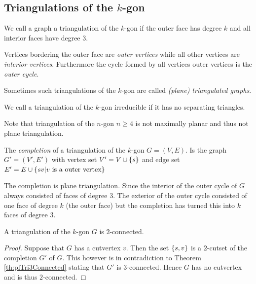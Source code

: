 \subsection{Triangulations of the $k$-gon}

\begin{defi}
We call a graph a triangulation of the $k$-gon if the outer face has degree $k$ and all interior faces have degree $3$.
\end{defi}
Vertices bordering the outer face are \emph{outer vertices} while all other vertices are \emph{interior vertices}. Furthermore the cycle formed by all vertices outer vertices is the \emph{outer cycle}.

Sometimes such triangulations of the $k$-gon are called \emph{(plane) triangulated graphs}.


\begin{defi}
We call a triangulation of the $k$-gon irreducible if it has no separating triangles.
\end{defi}


Note that triangulation of the $n$-gon $n\geq 4$ is not maximally planar and thus not plane triangulation.

The \emph{completion} of a triangulation of the $k$-gon $G = (V, E)$. Is the graph $G'= (V', E')$ with vertex set $V' = V \cup \left\lbrace {s} \right\rbrace$ and edge set $E' = E \cup \left\lbrace { sv | v \text{ is a outer vertex}} \right\rbrace$ 

The completion is plane triangulation.  %
Since the interior of the outer cycle of $G$ always consisted of faces of degree 3. The exterior of the outer cycle consisted of one face of degree $k$ (the outer face) but the completion has turned this into $k$ faces of degree $3$.  

\begin{thrm}
A triangulation of the $k$-gon $G$ is $2$-connected.
\end{thrm}
\begin{proof}
Suppose that $G$ has a cutvertex $v$. Then the set $\left\lbrace {s, v} \right\rbrace$ is a $2$-cutset of the completion $G'$ of $G$. This however is in contradiction to Theorem \ref{th:plTri3Connected} stating that $G'$ is $3$-connected. Hence $G$ has no cutvertex and is thus $2$-connected.
\end{proof}

